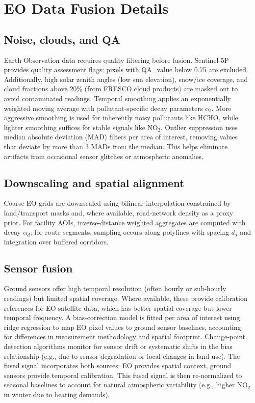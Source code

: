\documentclass[conference]{IEEEtran}
\begin{document}
\section{EO Data Fusion Details}
\subsection{Noise, clouds, and QA}
Earth Observation data requires quality filtering before fusion. Sentinel-5P provides quality assessment flags; pixels with QA\_value below 0.75 are excluded. Additionally, high solar zenith angles (low sun elevation), snow/ice coverage, and cloud fractions above 20\% (from FRESCO cloud products) are masked out to avoid contaminated readings. Temporal smoothing applies an exponentially weighted moving average with pollutant-specific decay parameters $\alpha_t$. More aggressive smoothing is used for inherently noisy pollutants like HCHO, while lighter smoothing suffices for stable signals like NO$_2$. Outlier suppression uses median absolute deviation (MAD) filters per area of interest, removing values that deviate by more than 3 MADs from the median. This helps eliminate artifacts from occasional sensor glitches or atmospheric anomalies.

\subsection{Downscaling and spatial alignment}
Coarse EO grids are downscaled using bilinear interpolation constrained by land/transport masks and, where available, road-network density as a proxy prior. For facility AOIs, inverse-distance weighted aggregates are computed with decay $\alpha_d$; for route segments, sampling occurs along polylines with spacing $d_s$ and integration over buffered corridors.

\subsection{Sensor fusion}
Ground sensors offer high temporal resolution (often hourly or sub-hourly readings) but limited spatial coverage. Where available, these provide calibration references for EO satellite data, which has better spatial coverage but lower temporal frequency. A bias-correction model is fitted per area of interest using ridge regression to map EO pixel values to ground sensor baselines, accounting for differences in measurement methodology and spatial footprint. Change-point detection algorithms monitor for sensor drift or systematic shifts in the bias relationship (e.g., due to sensor degradation or local changes in land use). The fused signal incorporates both sources: EO provides spatial context, ground sensors provide temporal calibration. This fused signal is then re-normalized to seasonal baselines to account for natural atmospheric variability (e.g., higher NO$_2$ in winter due to heating demands).
\end{document}
